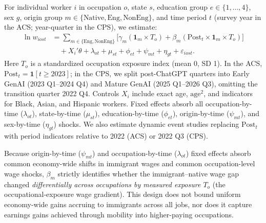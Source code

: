 \documentclass[11pt]{amsart}
\begin{document}
For individual worker $i$ in occupation $o$, state $s$, education group $e \in \{1,\dots,4\}$, sex $g$, origin group $m \in \{\text{Native}, \text{Eng}, \text{NonEng}\}$, and time period $t$ (survey year in the ACS; year-quarter in the CPS), we estimate:
\begin{equation}
\begin{aligned}
\ln w_{iost} &= \sum_{m \in \{\text{Eng}, \text{NonEng}\}} \Big[\gamma_m (\mathbf{1}_m \times T_o) + \beta_m (\text{Post}_t \times \mathbf{1}_m \times T_o)\Big] \\
&\quad + X_i'\theta + \lambda_{ot} + \mu_{st} + \phi_{et} + \psi_{mt} + \eta_{gt} + \varepsilon_{iost}.
\end{aligned}
\end{equation}
Here $T_o$ is a standardized occupation exposure index (mean 0, SD 1). In the ACS, $\text{Post}_t = \mathbf{1}[t \ge 2023]$; in the CPS, we split post-ChatGPT quarters into Early GenAI (2023 Q1--2024 Q4) and Mature GenAI (2025 Q1--2026 Q3), omitting the transition quarter 2022 Q4. Controls $X_i$ include exact age, $\text{age}^2$, and indicators for Black, Asian, and Hispanic workers. Fixed effects absorb all occupation-by-time ($\lambda_{ot}$), state-by-time ($\mu_{st}$), education-by-time ($\phi_{et}$), origin-by-time ($\psi_{mt}$), and sex-by-time ($\eta_{gt}$) shocks. We also estimate dynamic event studies replacing $\text{Post}_t$ with period indicators relative to 2022 (ACS) or 2022 Q3 (CPS).

Because origin-by-time ($\psi_{mt}$) and occupation-by-time ($\lambda_{ot}$) fixed effects absorb common economy-wide shifts in immigrant wages and common occupation-level wage shocks, $\beta_m$ strictly identifies whether the immigrant--native wage gap changed \emph{differentially across occupations by measured exposure $T_o$} (the occupational-exposure wage gradient). This design does not bound uniform economy-wide gains accruing to immigrants across all jobs, nor does it capture earnings gains achieved through mobility into higher-paying occupations.
\end{document}
